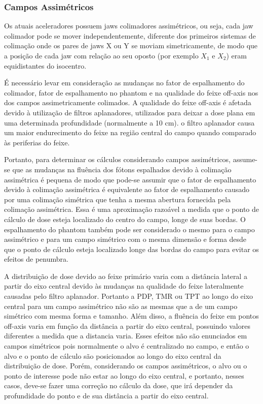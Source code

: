 \documentclass[11pt,a4paper]{article}
\newcounter{exemplo}
\begin{document}
\subsubsection*{Campos Assimétricos}

        Os atuais aceleradores possuem jaws colimadores assimétricos, ou seja, cada jaw colimador pode se mover independentemente, diferente dos primeiros sistemas de colimação onde os pares de jaws X ou Y se moviam simetricamente, de modo que a posição de cada jaw com relação ao seu oposto (por exemplo $X_1$ e $X_2$) eram equidistantes do isocentro. 

        É necessário levar em consideração as mudanças no fator de espalhamento do colimador, fator de espalhamento no phantom e na qualidade do feixe off-axis nos dos campos assimetricamente colimados.  A qualidade do feixe off-axis é afetada devido à utilização de filtros aplanadores, utilizados para deixar a dose plana em uma determinada profundidade (normalmente a 10 cm). o filtro aplanador causa um maior endurecimento do feixe na região central do campo quando comparado às periferias do feixe.

        Portanto, para determinar os cálculos considerando campos assimétricos, assume-se que as mudanças na fluência dos fótons espalhados devido à colimação assimétrica é pequena de modo que pode-se assumir que o fator de espalhamento devido à colimação assimétrica é equivalente ao fator de espalhamento causado por uma colimação simétrica que tenha a mesma abertura fornecida pela colimação assimétrica. Essa é uma aproximação razoável a medida que o ponto de cálculo de dose esteja localizado do centro do campo, longe de suas bordas. O espalhamento do phantom também pode ser considerado o mesmo para o campo assimétrico e para um campo simétrico com o mesma dimensão e forma desde que o ponto de cálculo esteja localizado longe das bordas do campo para evitar os efeitos de penumbra. 

        A distribuição de dose devido ao feixe primário varia com a distância lateral a partir do eixo central devido às mudanças na qualidade do feixe lateralmente causadas pelo filtro aplanador. Portanto a PDP, TMR ou TPT ao longo do eixo central para um campo assimétrico não são as mesmas que a de um campo simétrico com mesma forma e tamanho. Além disso, a fluência do feixe em pontos off-axis varia em função da distância a partir do eixo central, possuindo valores diferentes a medida que a distancia varia. Esses efeitos não são enunciados em campos simétricos pois normalmente o alvo é centralizado no campo, e então o alvo e o ponto de cálculo são posicionados ao longo do eixo central da distribuição de dose. Porém, considerando os campos assimétricos, o alvo ou o ponto de interesse pode não estar ao longo do eixo central, e portanto, nesses casos, deve-se fazer uma correção no cálculo da dose, que irá depender da profundidade do ponto e de sua distância a partir do eixo central.
\end{document}
